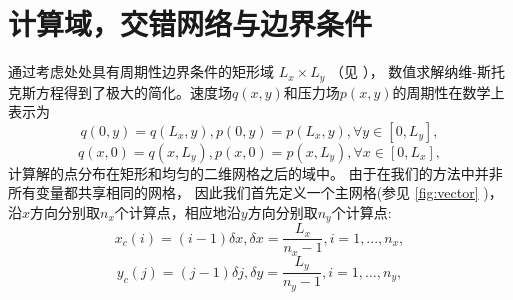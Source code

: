 \documentclass{ctexart}
\begin{document}
\section{计算域，交错网络与边界条件}
通过考虑处处具有周期性边界条件的矩形域
$ L_x \times L_y $ （见 ），
数值求解纳维-斯托克斯方程得到了极大的简化。速度场$q(x,y)$和压力场$p(x,y)$的周期性在数学上表示为
\begin{equation} \label{eq:y}
    q(0,y) = q(L_x,y),  p(0,y) = p(L_x,y),  \forall y \in [0,L_y],
\end{equation}
\begin{equation} \label{eq:x}
    q(x,0) = q(x,L_y),  p(x,0) = p(x,L_y),  \forall x \in [0,L_x],
\end{equation}
计算解的点分布在矩形和均匀的二维网格之后的域中。
由于在我们的方法中并非所有变量都共享相同的网格，
因此我们首先定义一个主网格(参见 \ref{fig:vector} )，沿$x$方向分别取$n_x$个计算点，相应地沿$y$方向分别取$n_y$个计算点:
\begin{equation} \label{eq:xc}
    x_c(i) = (i-1)\delta x,  \delta x = \frac{L_x}{n_x - 1},  i = 1,...,n_x,
\end{equation}
\begin{equation} \label{eq:yc}
    y_c(j) = (j-1)\delta j,  \delta y = \frac{L_y}{n_y - 1},  i = 1,...,n_y,
\end{equation}
\end{document}
